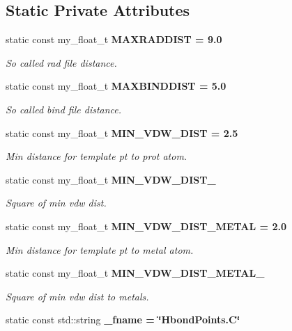 \subsection*{Static Private Attributes}
\begin{CompactItemize}
\item 
static const my\_\-float\_\-t \bf{MAXRADDIST} = 9.0\label{classSimSite3D_1_1HbondPoints_92890c70651529c4a1614cf1860ee411}

\begin{CompactList}\small\item\em So called rad file distance. \item\end{CompactList}\item 
static const my\_\-float\_\-t \bf{MAXBINDDIST} = 5.0\label{classSimSite3D_1_1HbondPoints_90584820c666418a18d36d3b8b84e5b8}

\begin{CompactList}\small\item\em So called bind file distance. \item\end{CompactList}\item 
static const my\_\-float\_\-t \bf{MIN\_\-VDW\_\-DIST} = 2.5\label{classSimSite3D_1_1HbondPoints_d891ae0c548a5c6850c3921581a98bb3}

\begin{CompactList}\small\item\em Min distance for template pt to prot atom. \item\end{CompactList}\item 
static const my\_\-float\_\-t \bf{MIN\_\-VDW\_\-DIST\_}
\begin{CompactList}\small\item\em Square of min vdw dist. \item\end{CompactList}\item 
static const my\_\-float\_\-t \bf{MIN\_\-VDW\_\-DIST\_\-METAL} = 2.0\label{classSimSite3D_1_1HbondPoints_56639b91eee7ddcb46dc46952accc1e9}

\begin{CompactList}\small\item\em Min distance for template pt to metal atom. \item\end{CompactList}\item 
static const my\_\-float\_\-t \bf{MIN\_\-VDW\_\-DIST\_\-METAL\_}
\begin{CompactList}\small\item\em Square of min vdw dist to metals. \item\end{CompactList}\item 
static const std::string \bf{\_\-fname} = \char`\"{}Hbond\-Points.C\char`\"{}\label{classSimSite3D_1_1HbondPoints_47f608875e817aa6b3ebf9a3c21b731f}


\end{CompactItemize}
